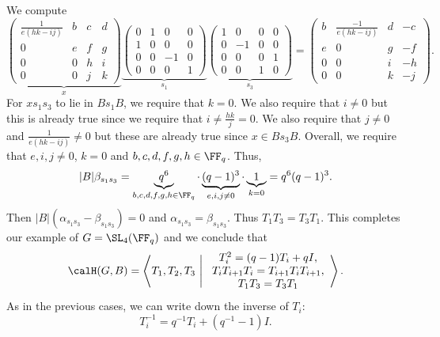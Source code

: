 \documentclass[11pt]{amsart}
\theoremstyle{remark}
\begin{document}
We compute
\[
	\underbrace{\begin{pmatrix}
			\frac{1}{e(hk-ij)} & b & c & d \\
			0                  & e & f & g \\
			0                  & 0 & h & i \\
			0                  & 0 & j & k
		\end{pmatrix}}_{x}
	\underbrace{
		\begin{pmatrix}
			0 & 1 & 0  & 0 \\
			1 & 0 & 0  & 0 \\
			0 & 0 & -1 & 0 \\
			0 & 0 & 0  & 1
		\end{pmatrix}}_{s_1}
	\underbrace{\begin{pmatrix}
			1 & 0  & 0 & 0 \\
			0 & -1 & 0 & 0 \\
			0 & 0  & 0 & 1 \\
			0 & 0  & 1 & 0
		\end{pmatrix}}_{s_3} =
	\begin{pmatrix}
		b & \frac{-1}{e(hk-ij)} & d & -c \\
		e & 0                   & g & -f \\
		0 & 0                   & i & -h \\
		0 & 0                   & k & -j
	\end{pmatrix}.
\]
For $xs_1s_3$ to lie in $Bs_1B$, we require that $k=0$.
We also require that $i\neq 0$ but this is already true since we require that $i\neq \frac{hk}{j}=0$.
We also require that $j\neq 0$ and $\frac{1}{e(hk-ij)}\neq 0$ but these are already true since $x\in Bs_3B$.
Overall, we require that $e,i,j\neq 0$, $k=0$ and $b,c,d,f,g,h\in\FF_q$.
Thus,
\[
	|B|\beta_{s_1s_3} = \underbrace{q^6}_{b,c,d,f,g,h\in\FF_q}\cdot\underbrace{(q-1)^3}_{e,i,j\neq 0} \cdot \underbrace{1}_{k=0} = q^6(q-1)^3.
\]
Then $|B|(\alpha_{s_1s_3}-\beta_{s_1s_3}) = 0$ and $\alpha_{s_1s_3}=\beta_{s_1s_3}$.
Thus $T_1T_3=T_3T_1$.
This completes our example of $G=\SL_4(\FF_q)$ and we conclude that
\[
	\calH(G,B) = \left\langle T_1,T_2,T_3\ \Bigg|\ \begin{array}{c}
		T_i^2 = (q-1)T_i + qI,             \\
		T_iT_{i+1}T_i = T_{i+1}T_iT_{i+1}, \\
		T_1T_3=T_3T_1
	\end{array}\right\rangle.
\]
As in the previous cases, we can write down the inverse of $T_i$:
\[
	T_i^{-1} = q^{-1}T_i + (q^{-1}-1)I.
\]
\end{document}
